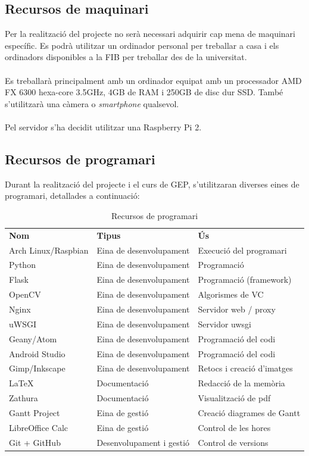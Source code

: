 	\subsection{Recursos de maquinari}
		Per la realització del projecte no serà necessari adquirir cap mena de maquinari específic. Es podrà utilitzar un ordinador personal per treballar a casa i els ordinadors disponibles a la FIB per
		treballar des de la universitat.\\\\
		Es treballarà principalment amb un ordinador equipat amb un processador AMD FX 6300 hexa-core 3.5GHz, 4GB de RAM i 250GB de disc dur SSD. També s'utilitzarà una càmera o \textit{smartphone} qualsevol.\\\\
		Pel servidor s'ha decidit utilitzar una Raspberry Pi 2.
	\subsection{Recursos de programari}
	Durant la realització del projecte i el curs de GEP, s'utilitzaran diverses eines de programari, detallades a continuació:\\
	\begin{table}[H]
		\begin{center}
			\begin{tabular}{l !{\vrule width -1pt}p{5cm} !{\vrule width -1pt}p{5cm}}
				\textbf{Nom} & \textbf{Tipus} & \textbf{Ús} \\ %
				Arch Linux/Raspbian & Eina de desenvolupament & Execució del programari \\
				Python & Eina de desenvolupament & Programació \\
				Flask & Eina de desenvolupament & Programació (framework) \\
				OpenCV & Eina de desenvolupament & Algorismes de VC \\
				Nginx & Eina de desenvolupament & Servidor web / proxy \\
				uWSGI & Eina de desenvolupament & Servidor uwsgi \\
				Geany/Atom & Eina de desenvolupament & Programació del codi \\
				Android Studio & Eina de desenvolupament & Programació del codi \\
				Gimp/Inkscape & Eina de desenvolupament & Retocs i creació d'imatges \\
				\LaTeX & Documentació & Redacció de la memòria \\
				Zathura & Documentació & Visualització de pdf \\
				Gantt Project & Eina de gestió & Creació diagrames de Gantt \\
				LibreOffice Calc & Eina de gestió & Control de les hores \\
				Git + GitHub & Desenvolupament i gestió & Control de versions \\
			\end{tabular}
		\end{center}
		\caption{Recursos de programari}
		\label{table:programari}
	\end{table}
	
